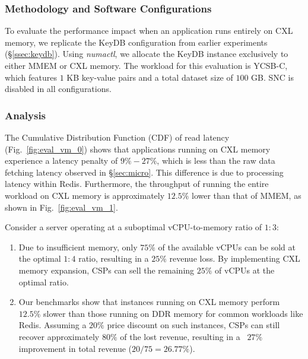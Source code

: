 \subsubsection{Methodology and Software Configurations}

To evaluate the performance impact when an application runs entirely on CXL memory, we replicate the KeyDB configuration from earlier experiments (\S\ref{ssec:keydb}). Using \textit{numactl}, we allocate the KeyDB instance exclusively to either MMEM or CXL memory. The workload for this evaluation is YCSB-C, which features $1$ KB key-value pairs and a total dataset size of $100$ GB. SNC is disabled in all configurations.

\subsubsection{Analysis}

The Cumulative Distribution Function (CDF) of read latency (Fig.~\ref{fig:eval_vm_0}) shows that applications running on CXL memory experience a latency penalty of $9\%-27\%$, which is less than the raw data fetching latency observed in \S\ref{sec:micro}. This difference is due to processing latency within Redis. Furthermore, the throughput of running the entire workload on CXL memory is approximately $12.5\%$ lower than that of MMEM, as shown in Fig.~\ref{fig:eval_vm_1}.

Consider a server operating at a suboptimal vCPU-to-memory ratio of $1:3$:
\begin{enumerate}[leftmargin=*, itemsep=0pt]
    \item Due to insufficient memory, only $75\%$ of the available vCPUs can be sold at the optimal $1:4$ ratio, resulting in a $25\%$ revenue loss. By implementing CXL memory expansion, CSPs can sell the remaining $25\%$ of vCPUs at the optimal ratio.
    \item Our benchmarks show that instances running on CXL memory perform $12.5\%$ slower than those running on DDR memory for common workloads like Redis. Assuming a $20\%$ price discount on such instances, CSPs can still recover approximately $80\%$ of the lost revenue, resulting in a ~$27\%$ improvement in total revenue ($20/75 = 26.77\%$).
\end{enumerate}



